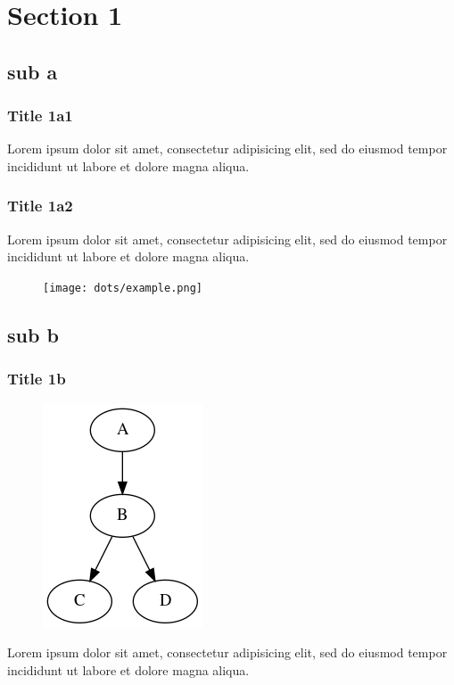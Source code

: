 \documentclass[beamer]{standalone}
\begin{document}
\section{Section 1}
\subsection{sub a}
\begin{frame}
\frametitle{Title 1a1}
Lorem ipsum dolor sit amet, consectetur adipisicing elit, sed do eiusmod tempor incididunt ut labore et dolore magna aliqua.
\end{frame}
\begin{frame}
\frametitle{Title 1a2}
Lorem ipsum dolor sit amet, consectetur adipisicing elit, sed do eiusmod tempor incididunt ut labore et dolore magna aliqua.
\begin{figure}
\centerline{\texttt{[image: dots/example.png]}}
\end{figure}
\end{frame}
\subsection{sub b}
\begin{frame}
\frametitle{Title 1b}
\begin{figure}
\centerline{\includegraphics[scale=.5]{imgs/foo.png}}
\end{figure}
Lorem ipsum dolor sit amet, consectetur adipisicing elit, sed do eiusmod tempor incididunt ut labore et dolore magna aliqua.
\end{frame}
\end{document}
